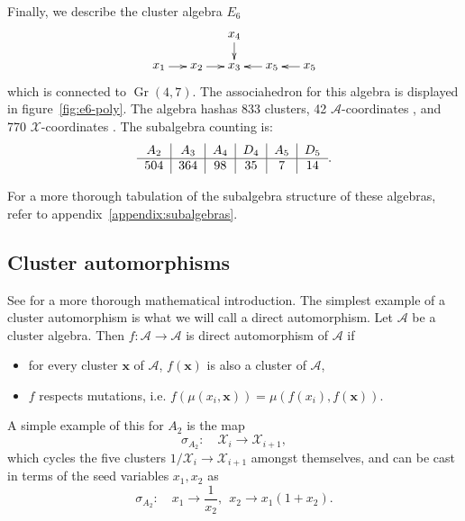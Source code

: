 \documentclass[11pt]{article}
\DeclareMathOperator{\Gr}{Gr}
\def\x{\mathcal{X}}
\def\xcoords{$\mathcal{X}$-coordinates }
\def\a{\mathcal{A}}
\def\acoords{$\mathcal{A}$-coordinates }
\begin{document}
Finally, we describe the cluster algebra $E_6$
\begin{equation}\label{def:E6}
    \begin{gathered}
    \begin{xy} 0;<1pt,0pt>:<0pt,-1pt>::
      (0,0) *+{x_1} ="1",
      (30,0) *+{x_2} ="2",
      (60,0) *+{x_3} ="3",
      (60,-25) *+{x_4} ="4",
      (90,0) *+{x_5} ="5",
      (120,0) *+{x_5} ="6",
      "1", {\ar"2"},
      "2", {\ar"3"},
      "4", {\ar"3"},
      "5", {\ar"3"},
      "6", {\ar"5"},
    \end{xy}
    \end{gathered}
\end{equation}
which is connected to $\Gr(4,7)$. The associahedron for this algebra is displayed in figure~\ref{fig:e6-poly}. The algebra hashas 833 clusters, 42 \acoords, and 770 \xcoords. The subalgebra counting is: 
\begin{equation}
\begin{tabular}{ c|c|c|c|c|c} 
 $A_2$ & $A_3$ & $A_4$ & $D_4$ & $A_5$ & $D_5$ \\ 
 \hline
504 & 364 & 98 & 35 & 7 & 14
\end{tabular}.
\end{equation}

For a more thorough tabulation of the subalgebra structure of these algebras, refer to appendix~\ref{appendix:subalgebras}.

\subsection{Cluster automorphisms}\label{sec:automorphisms}

See \cite{Chang:2015} for a more thorough mathematical introduction. The simplest example of a cluster automorphism is what we will call a direct automorphism. Let $\a$ be a cluster algebra. Then $f: \a \to \a$ is direct automorphism of $\a$ if
\begin{itemize}
  \item for every cluster $\mathbf{x}$ of $\a$, $f(\mathbf{x})$ is also a cluster of $\a$,
  \item $f$ respects mutations, i.e. $f(\mu(x_i,\mathbf{x})) = \mu(f(x_i),f(\mathbf{x}))$.
 \end{itemize} 
A simple example of this for $A_2$ is the map
\begin{equation}
  \sigma_{A_2}:\quad \mathcal{X}_i \to \mathcal{X}_{i+1},
\end{equation}
which cycles the five clusters $1/\x_i\to \x_{i+1}$ amongst themselves, and can be cast in terms of the seed variables $x_1, x_2$ as 
\begin{equation}
  \sigma_{A_2}:\quad x_1\to \frac{1}{x_2},~~ x_2\to x_1(1+x_2).
\end{equation}
\end{document}
